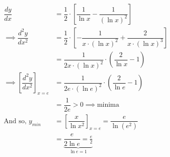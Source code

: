 \documentclass[14pt,fleqn]{extarticle}
\begin{document}
\begin{question}
\begin{step}
	
        \begin{align}
          \dfrac{dy}{dx} &= \dfrac{1}{2}\cdot \left[\dfrac{1}{\ln x}-\dfrac{1}{(\ln x)^2}\right]\\
          \implies\dfrac{d^2 y}{dx^2} &= \dfrac{1}{2}\cdot 
          \left[-\dfrac{1}{x\cdot (\ln x)^2} + \dfrac{2}{x\cdot (\ln x)^3}\right] \\
          &= \dfrac{1}{2x\cdot (\ln x)^2}\cdot \left(\dfrac{2}{\ln x} - 1 \right) \\
          \implies \left[\dfrac{d^2 y}{dx^2}\right]_{x=e} &= 
          \dfrac{1}{2e\cdot (\ln e)^2}\cdot \left(\dfrac{2}{\ln e} - 1\right) \\
          &= \dfrac{1}{2e}> 0\implies \text{minima} \\
          \text{And so, }y_{min} &= \left[\dfrac{x}{\ln x^2}\right]_{x=e} = 
          \dfrac{e}{\ln \left(e^2 \right)} \\
          &= \underbrace{\dfrac{e}{2\ln e} = \frac{e}{2}}_{\ln e = 1 }
        \end{align}
        
\end{step}
\end{question}
\end{document}
